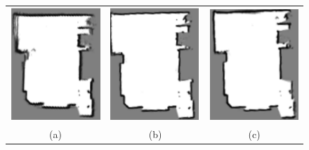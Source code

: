 \documentclass{article}
\begin{document}
\begin{figure}
    \centering
    \begin{tabular}{c c c}
         \includegraphics{images/figa.png} & \includegraphics{images/figb.png} & \includegraphics{images/figc.png}\\ (a) & (b) & (c)\\

\end{tabular}
\end{figure}
\end{document}

